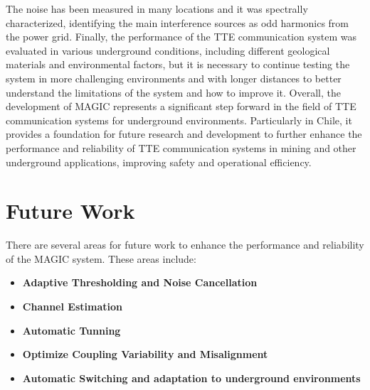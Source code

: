 \newp
The noise has been measured in many locations and it was spectrally characterized, identifying the main interference sources as odd harmonics from the power grid.
\newp
Finally, the performance of the TTE communication system was evaluated in various underground conditions, including different geological materials and environmental factors, but it is necessary to continue testing the system in more challenging environments and with longer distances to better understand the limitations of the system and how to improve it.
\newp
Overall, the development of MAGIC represents a significant step forward in the field of TTE communication systems for underground environments. Particularly in Chile, it provides a foundation for future research and development to further enhance the performance and reliability of TTE communication systems in mining and other underground applications, improving safety and operational efficiency.

\section{Future Work}

There are several areas for future work to enhance the performance and reliability of the MAGIC system. These areas include:

\begin{itemize}
    \item \textbf{Adaptive Thresholding and Noise Cancellation}
    \item \textbf{Channel Estimation}
    \item \textbf{Automatic Tunning}
    \item \textbf{Optimize Coupling Variability and Misalignment}
    \item \textbf{Automatic Switching and adaptation to underground environments}
\end{itemize}

